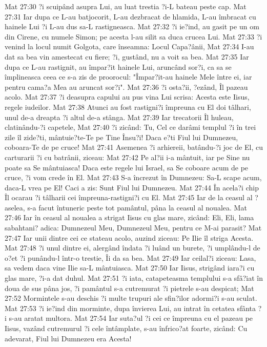 Mat 27:30  ?i scuipând asupra Lui, au luat trestia ?i-L bateau peste cap.
Mat 27:31  Iar dupa ce L-au batjocorit, L-au dezbracat de hlamida, L-au îmbracat cu hainele Lui ?i L-au dus sa-L rastigneasca.
Mat 27:32  ?i ie?ind, au gasit pe un om din Cirene, cu numele Simon; pe acesta l-au silit sa duca crucea Lui.
Mat 27:33  ?i venind la locul numit Golgota, care înseamna: Locul Capa?ânii,
Mat 27:34  I-au dat sa bea vin amestecat cu fiere; ?i, gustând, nu a voit sa bea.
Mat 27:35  Iar dupa ce L-au rastignit, au împar?it hainele Lui, aruncând sor?i, ca sa se împlineasca ceea ce s-a zis de proorocul: "Împar?it-au hainele Mele între ei, iar pentru cama?a Mea au aruncat sor?i".
Mat 27:36  ?i osta?ii, ?ezând, Îl pazeau acolo.
Mat 27:37  ?i deasupra capului au pus vina Lui scrisa: Acesta este Iisus, regele iudeilor.
Mat 27:38  Atunci au fost rastigni?i împreuna cu El doi tâlhari, unul de-a dreapta ?i altul de-a stânga.
Mat 27:39  Iar trecatorii Îl huleau, clatinându-?i capetele,
Mat 27:40  ?i zicând: Tu, Cel ce darâmi templul ?i în trei zile îl zide?ti, mântuie?te-Te pe Tine Însu?i! Daca e?ti Fiul lui Dumnezeu, coboara-Te de pe cruce!
Mat 27:41  Asemenea ?i arhiereii, batându-?i joc de El, cu carturarii ?i cu batrânii, ziceau:
Mat 27:42  Pe al?ii i-a mântuit, iar pe Sine nu poate sa Se mântuiasca! Daca este regele lui Israel, sa Se coboare acum de pe cruce, ?i vom crede în El.
Mat 27:43  S-a încrezut în Dumnezeu: Sa-L scape acum, daca-L vrea pe El! Caci a zis: Sunt Fiul lui Dumnezeu.
Mat 27:44  În acela?i chip Îl ocarau ?i tâlharii cei împreuna-rastigni?i cu El.
Mat 27:45  Iar de la ceasul al ?aselea, s-a facut întuneric peste tot pamântul, pâna la ceasul al noualea.
Mat 27:46  Iar în ceasul al noualea a strigat Iisus cu glas mare, zicând: Eli, Eli, lama sabahtani? adica: Dumnezeul Meu, Dumnezeul Meu, pentru ce M-ai parasit?
Mat 27:47  Iar unii dintre cei ce stateau acolo, auzind ziceau: Pe Ilie îl striga Acesta.
Mat 27:48  ?i unul dintre ei, alergând îndata ?i luând un burete, ?i umplându-l de o?et ?i punându-l într-o trestie, Îi da sa bea.
Mat 27:49  Iar ceilal?i ziceau: Lasa, sa vedem daca vine Ilie sa-L mântuiasca.
Mat 27:50  Iar Iisus, strigând iara?i cu glas mare, ?i-a dat duhul.
Mat 27:51  ?i iata, catapeteasma templului s-a sfâ?iat în doua de sus pâna jos, ?i pamântul s-a cutremurat ?i pietrele s-au despicat;
Mat 27:52  Mormintele s-au deschis ?i multe trupuri ale sfin?ilor adormi?i s-au sculat.
Mat 27:53  ?i ie?ind din morminte, dupa învierea Lui, au intrat în cetatea sfânta ?i s-au aratat multora.
Mat 27:54  Iar suta?ul ?i cei ce împreuna cu el pazeau pe Iisus, vazând cutremurul ?i cele întâmplate, s-au înfrico?at foarte, zicând: Cu adevarat, Fiul lui Dumnezeu era Acesta!
